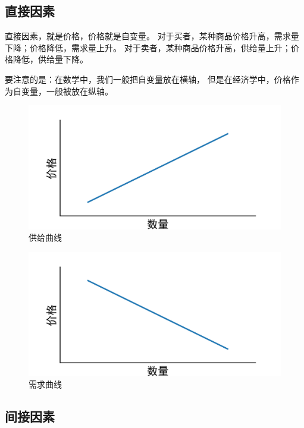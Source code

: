 \documentclass[UTF8]{article}
\begin{document}
    \subsection{直接因素}
        直接因素，就是价格，价格就是自变量。
        对于买者，某种商品价格升高，需求量下降；价格降低，需求量上升。
        对于卖者，某种商品价格升高，供给量上升；价格降低，供给量下降。\par
        要注意的是：在数学中，我们一般把自变量放在横轴，
        但是在经济学中，价格作为自变量，一般被放在纵轴。
        \begin{figure}[H]
            \centering
            \includegraphics[width = 1 \textwidth]{供给曲线.png}
            \caption{供给曲线}
        \end{figure}
        \begin{figure}[H]
            \centering
            \includegraphics[width = 1 \textwidth]{需求曲线.png}
            \caption{需求曲线}
        \end{figure}

    \subsection{间接因素}
\end{document}
